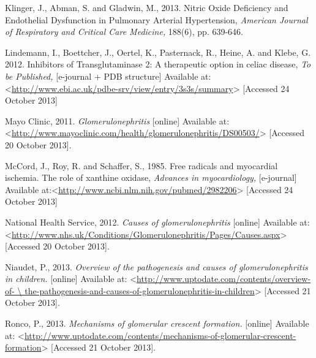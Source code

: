 \documentclass[11pt]{report}
\begin{document}
Klinger, J., Abman, S. and Gladwin, M., 2013. Nitric Oxide Deficiency and Endothelial Dysfunction in Pulmonary Arterial Hypertension, \textit{American Journal of Respiratory and Critical Care Medicine,} 188(6), pp. 639-646.
\newline
\newline

Lindemann, I., Boettcher, J., Oertel, K., Pasternack, R., Heine, A. and Klebe, G. 2012. Inhibitors of Transglutaminase 2: A therapeutic option in celiac disease, \textit{To be Published,} [e-journal + PDB structure] Available at:<\url{http://www.ebi.ac.uk/pdbe-srv/view/entry/3s3s/summary}> [Accessed 24 October 2013]
\newline
\newline

Mayo Clinic, 2011. \textit{Glomerulonephritis} [online] Available at: <\url{http://www.mayoclinic.com/health/glomerulonephritis/DS00503/}> [Accessed 20 October 2013].
\newline
\newline

McCord, J., Roy, R. and Schaffer, S., 1985. Free radicals and myocardial ischemia. The role of xanthine oxidase, \textit{Advances in myocardiology,} [e-journal] Available at:<\url{http://www.ncbi.nlm.nih.gov/pubmed/2982206}> [Accessed 24 October 2013]
\newline
\newline

National Health Service, 2012. \textit{Causes of glomerulonephritis} [online] Available at: <\url{http://www.nhs.uk/Conditions/Glomerulonephritis/Pages/Causes.aspx}> [Accessed 20 October 2013].
\newline
\newline

Niaudet, P., 2013. \textit{Overview of the pathogenesis and causes of glomerulonephritis in children.} [online] Available at: <\url{http://www.uptodate.com/contents/overview-of- \ the-pathogenesis-and-causes-of-glomerulonephritis-in-children}> [Accessed 21 October 2013].
\newline
\newline

Ronco, P., 2013. \textit{Mechanisms of glomerular crescent formation.} [online] Available at: <\url{http://www.uptodate.com/contents/mechanisms-of-glomerular-crescent-formation}> [Accessed 21 October 2013].
\newline
\newline
\end{document}
